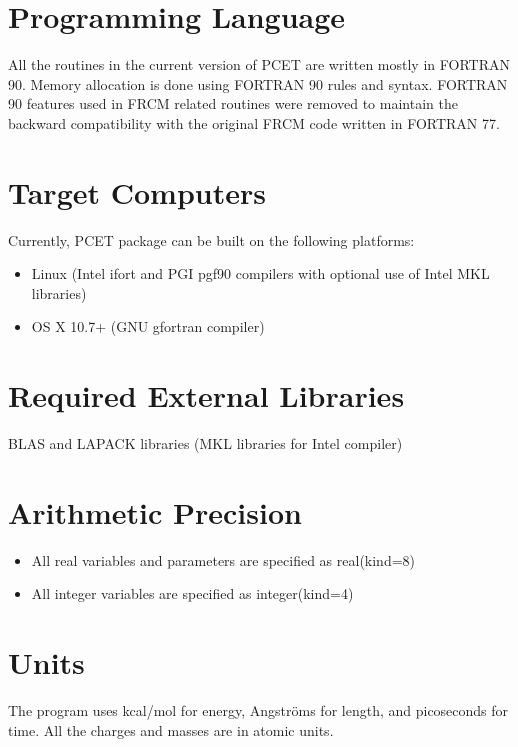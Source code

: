 \documentclass[oneside,11pt,openany]{book}
\newcommand{\tw}{\ttfamily}
\begin{document}
\section{Programming Language}
All the routines in the current version of PCET are written
mostly in FORTRAN 90. Memory allocation is done using
FORTRAN 90 rules and syntax. FORTRAN 90 features
used in FRCM related routines were removed to maintain
the backward compatibility with the original FRCM code
written in FORTRAN 77.

\section{Target Computers}
Currently, PCET package can be built on the following platforms:
\begin{itemize}
\item Linux (Intel ifort and PGI pgf90 compilers with optional use of Intel MKL libraries)
\item OS X 10.7+ (GNU gfortran compiler)
\end{itemize}

\section{Required External Libraries}
BLAS and LAPACK libraries (MKL libraries for Intel compiler)

\section{Arithmetic Precision}
\begin{itemize}
\item All real variables and parameters are specified as {\tw real(kind=8)}
\item All integer variables are specified as {\tw integer(kind=4)}
\end{itemize}

\section{Units}
The program uses kcal/mol for energy, Angstr\"oms for length, and picoseconds
for time. All the charges and masses are in atomic units.
\end{document}
